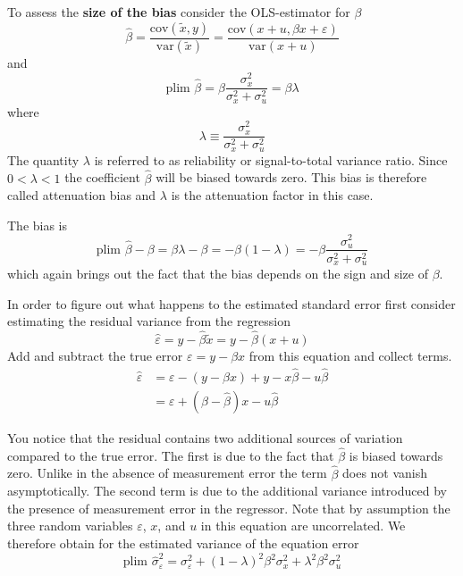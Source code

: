\documentclass[12pt]{article}
\begin{document}
To assess the \textbf{size of the bias} consider the OLS-estimator for $\beta$
\[
\hat{\beta} = \frac{\text{cov}(\tilde{x}, y)}{\text{var}(\tilde{x})} = \frac{\text{cov}(x + u, \beta x + \varepsilon)}{\text{var}(x + u)}
\]
and
\[
\text{plim } \hat{\beta} = \beta \frac{\sigma_x^2}{\sigma_x^2 + \sigma_u^2} = \beta \lambda
\]
where
\[
\lambda \equiv \frac{\sigma_x^2}{\sigma_x^2 + \sigma_u^2}
\]
The quantity $\lambda$ is referred to as reliability or signal-to-total variance ratio. Since $0 < \lambda < 1$ the coefficient $\hat{\beta}$ will be biased towards zero. This bias is therefore called attenuation bias and $\lambda$ is the attenuation factor in this case.


The bias is
\[
\text{plim } \hat{\beta} - \beta = \beta \lambda - \beta = -\beta(1 - \lambda) = -\beta \frac{\sigma_u^2}{\sigma_x^2 + \sigma_u^2}
\]
which again brings out the fact that the bias depends on the sign and size of $\beta$.

In order to figure out what happens to the estimated standard error first consider estimating the residual variance from the regression
\[
\hat{\varepsilon} = y - \hat{\beta}\tilde{x} = y - \hat{\beta}(x + u)
\]
Add and subtract the true error $\varepsilon = y - \beta x$ from this equation and collect terms.
\begin{align*}
\hat{\varepsilon} &= \varepsilon - (y - \beta x) + y - x\hat{\beta} - u\hat{\beta}\\
&= \varepsilon + (\beta - \hat{\beta})x - u\hat{\beta}
\end{align*}

You notice that the residual contains two additional sources of variation compared to the true error. The first is due to the fact that $\hat{\beta}$ is biased towards zero. Unlike in the absence of measurement error the term $\hat{\beta}$ does not vanish asymptotically. The second term is due to the additional variance introduced by the presence of measurement error in the regressor. Note that by assumption the three random variables $\varepsilon$, $x$, and $u$ in this equation are uncorrelated. We therefore obtain for the estimated variance of the equation error
\[
\text{plim } \hat{\sigma}_{\varepsilon}^2 = \sigma_{\varepsilon}^2 + (1 - \lambda)^2 \beta^2 \sigma_x^2 + \lambda^2 \beta^2 \sigma_u^2
\]
\end{document}
